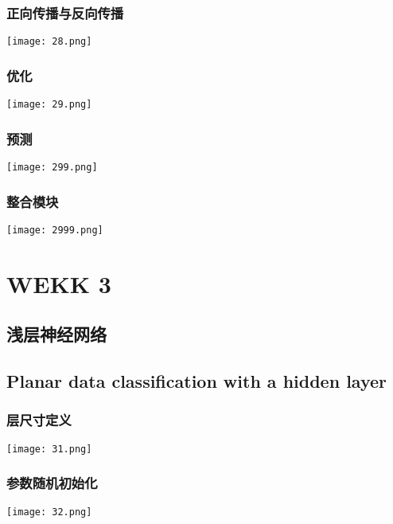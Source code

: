 \documentclass[UTF_8]{ctexart}
\begin{document}
\clearpage
\subsubsection{正向传播与反向传播}
\centering
\texttt{[image: 28.png]}


\subsubsection{优化}
\centering
\texttt{[image: 29.png]}

\subsubsection{预测}
\centering
\texttt{[image: 299.png]}

\subsubsection{整合模块}
\centering
\texttt{[image: 2999.png]}

\clearpage
\section{WEKK 3}

\clearpage
\subsection{浅层神经网络}

\clearpage
\subsection{Planar data classification with a hidden layer}

\subsubsection{层尺寸定义}
\centering
\texttt{[image: 31.png]}

\subsubsection{参数随机初始化}
\centering
\texttt{[image: 32.png]}
\end{document}

